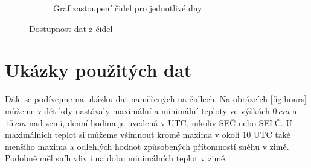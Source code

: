\begin{figure}
\begin{subfigure}{0.45\textwidth}
	\caption{Graf zastoupení čidel pro jednotlivé dny}
	\label{fig:dostupnostdnu}
	\end{subfigure}
	\caption{Dostupnost dat z čidel}
\end{figure}

\section{Ukázky použitých dat}
Dále se podívejme na ukázku dat naměřených na čidlech. Na obrázcích \ref{fig:hours} můžeme vidět kdy nastávaly maximální a minimální teploty ve výškách $\SI{0}{cm}$ a $\SI{15}{cm}$ nad zemí, denní hodina je uvedená v UTC, nikoliv SEČ nebo SELČ. U maximálních teplot si můžeme všimnout kromě maxima v okolí 10 UTC také menšího maxima a odlehlých hodnot způsobených přítomností sněhu v zimě. Podobně měl sníh vliv i na dobu minimálních teplot v zimě.

